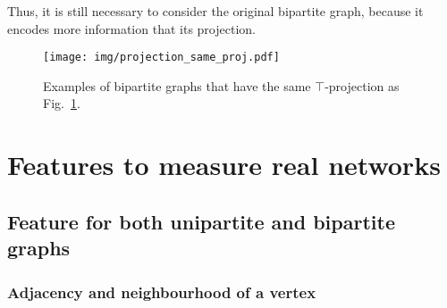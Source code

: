 \documentclass[table]{report}
\begin{document}
Thus, it is still necessary to consider the original bipartite graph, because it encodes more information that its projection. 


\begin{figure}[h]%
\centering
\texttt{[image: img/projection\_same\_proj.pdf]}
\caption{Examples of bipartite graphs that have the same $\top$-projection as Fig.~\ref{fig:projection_example}.}
\label{fig:projection_example}
\end{figure}
\FloatBarrier

%
%
%
%
%

\section{Features to measure real networks}

\subsection{Feature for both unipartite and bipartite graphs}

\subsubsection{Adjacency and neighbourhood of a vertex}
\end{document}

